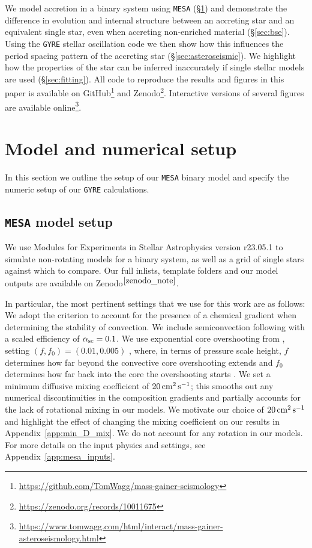 \documentclass[desactivate]{aa}
\newcommand{\referee}[1]{{#1}}
\begin{document}
We model accretion in a binary system using \texttt{MESA} (\S\ref{sec:methods}) and demonstrate the difference in evolution and internal structure between an accreting star and an equivalent single star, even when accreting non-enriched material (\S\ref{sec:bse}). Using the \texttt{GYRE} stellar oscillation code we then show how this influences the period spacing pattern of the accreting star (\S\ref{sec:asteroseismic}). We highlight how the properties of the star can be inferred inaccurately if single stellar models are used (\S\ref{sec:fitting}). All code to reproduce the results and figures in this paper is available on GitHub\footnote{\url{https://github.com/TomWagg/mass-gainer-seismology}} and Zenodo\footnote{\url{https://zenodo.org/records/10011675}\label{zenodo_note}}. Interactive versions of several figures are available online\footnote{\url{https://www.tomwagg.com/html/interact/mass-gainer-asteroseismology.html}}.

\section{Model and numerical setup} \label{sec:methods}

In this section we outline the setup of our \texttt{MESA} binary model and specify the numeric setup of our \texttt{GYRE} calculations.

\subsection{\texttt{MESA} model setup}\label{sec:model_setup}

We use Modules for Experiments in Stellar Astrophysics \citep[\texttt{MESA},][]{Paxton2011, Paxton2013, Paxton2015, Paxton2018, Paxton2019, Jermyn2023} version r23.05.1 \citep{mesa_zenodo} to simulate non-rotating models for a binary system, as well as a grid of single stars against which to compare. Our full inlists, template folders and our model outputs are available on Zenodo$^{\ref{zenodo_note}}$.

In particular, the most pertinent settings that we use for this work are as follows: We adopt the \citet{Ledoux+1947} criterion to account for the presence of a chemical gradient when determining the stability of convection. We include semiconvection following \citet{Langer+1983} with a scaled efficiency of $\alpha_{\rm sc}=0.1$. We use exponential core overshooting from \cite{Herwig+2000}, setting $(f, f_0) = (0.01, 0.005)$ \citep{Claret+2017}\referee{, where, in terms of pressure scale height, $f$ determines how far beyond the convective core overshooting extends and $f_0$ determines how far back into the core the overshooting starts \citep[see][for more details]{Herwig+2000, Paxton2011}}. We set a minimum diffusive mixing coefficient of $20\,{\rm cm^2 \, s^{-1}}$; this smooths out any numerical discontinuities in the composition gradients and partially accounts for the lack of rotational mixing in our models. We motivate our choice of $20\,{\rm cm^2 \, s^{-1}}$ and highlight the effect of changing the mixing coefficient on our results in Appendix~\ref{app:min_D_mix}. We do not account for any rotation in our models. For more details on the input physics and settings, see Appendix~\ref{app:mesa_inputs}. 
\end{document}
